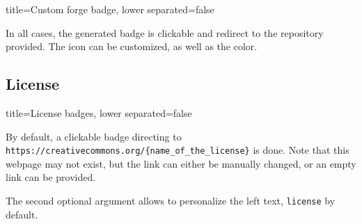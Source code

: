 \begin{tcblisting}{title={Custom forge badge}, lower separated=false}
\end{tcblisting}

In all cases, the generated badge is clickable and redirect to the repository provided.
The icon can be customized, as well as the color.

\subsection{License}

\begin{tcblisting}{title={License badges}, lower separated=false}
\end{tcblisting}

By default, a clickable badge directing to \texttt{https://creativecommons.org/\{name\_of\_the\_license\}} is done.
Note that this webpage may not exist, but the link can either be manually changed, or an empty link can be provided.

The second optional argument allows to personalize the left text, \texttt{license} by default.

